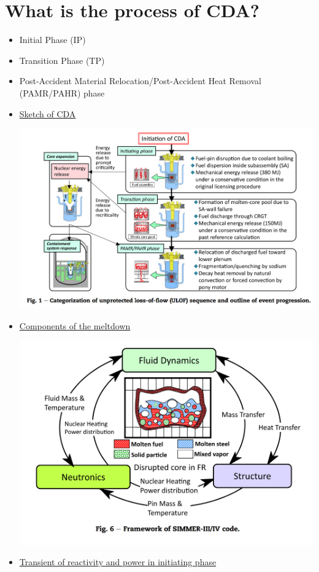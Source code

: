 \documentclass[11pt]{article}
\begin{document}
\section{What is the process of CDA?}
\label{sec:org48fa77d}
\begin{itemize}
\item Initial Phase (IP)
\item Transition Phase (TP)
\item Post-Accident Material Relocation/Post-Accident Heat Removal (PAMR/PAHR) phase
\item \href{images/CDA.png}{Sketch of CDA}
\begin{center}
\includegraphics[width=.9\linewidth]{images/CDA.png}
\end{center}
\item \href{images/framework\_code.png}{Components of the meltdown}
\begin{center}
\includegraphics[width=.9\linewidth]{images/framework_code.png}
\end{center}
\item \href{images/transient.png}{Transient of reactivity and power in initiating phase}

\end{itemize}
\end{document}
